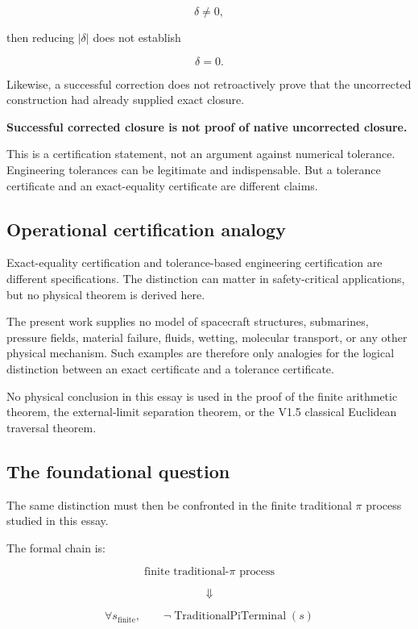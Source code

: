 \documentclass[11pt,a4paper]{article}
\begin{document}
\[
\delta\neq0,
\]

then reducing \(|\delta|\) does not establish

\[
\delta=0.
\]

Likewise, a successful correction does not retroactively prove that the
uncorrected construction had already supplied exact closure.

\begin{center}
\textbf{Successful corrected closure is not proof of native uncorrected closure.}
\end{center}

This is a certification statement, not an argument against numerical
tolerance. Engineering tolerances can be legitimate and indispensable.
But a tolerance certificate and an exact-equality certificate are
different claims.


\subsection{Operational certification analogy}

Exact-equality certification and tolerance-based engineering
certification are different specifications.  The distinction can
matter in safety-critical applications, but no physical theorem is
derived here.

The present work supplies no model of spacecraft structures,
submarines, pressure fields, material failure, fluids, wetting,
molecular transport, or any other physical mechanism.  Such examples
are therefore only analogies for the logical distinction between an
exact certificate and a tolerance certificate.

No physical conclusion in this essay is used in the proof of the
finite arithmetic theorem, the external-limit separation theorem, or
the V1.5 classical Euclidean traversal theorem.


\subsection{The foundational question}

The same distinction must then be confronted in the finite traditional
\(\pi\) process studied in this essay.

The formal chain is:

\[
\text{finite traditional-}\pi\text{ process}
\]

\[
\Downarrow
\]

\[
\forall s_{\mathrm{finite}},
\qquad
\neg\operatorname{TraditionalPiTerminal}(s)
\]
\end{document}
